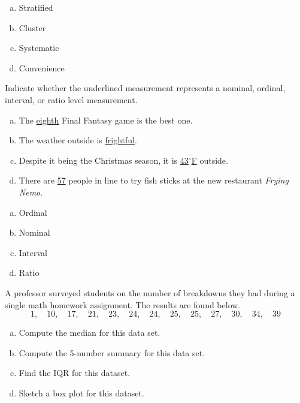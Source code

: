 \documentclass[12pt,letterpaper]{exam}
\begin{document}
\begin{questions}
\sol 
\begin{enumerate}[(a)]
\item Stratified \pspace

\item Cluster \pspace

\item Systematic \pspace

\item Convenience 
\end{enumerate}



\newpage
\question[10] Indicate whether the underlined measurement represents a nominal, ordinal, interval, or ratio level measurement.
	\begin{enumerate}[(a)]
	\item The \underline{eighth} Final Fantasy game is the best one. 
	\item The weather outside is \underline{frightful}. 	
	\item Despite it being the Christmas season, it is \underline{43$^\circ$F} outside. 
	\item There are \underline{57} people in line to try fish sticks at the new restaurant \textit{Frying Nemo}. 
	\end{enumerate} \pspace

\sol 
\begin{enumerate}[(a)]
\item Ordinal \pspace

\item Nominal \pspace

\item Interval \pspace

\item Ratio
\end{enumerate}



\newpage
\question[10] A professor surveyed students on the number of breakdowns they had during a single math homework assignment. The results are found below. 
	\[
	1, \quad 10, \quad 17, \quad 21, \quad 23, \quad 24, \quad 24, \quad 25, \quad 25, \quad 27, \quad 30, \quad 34, \quad 39
	\]

\begin{enumerate}[(a)]
\item Compute the median for this data set. 
\item Compute the 5-number summary for this data set. 
\item Find the IQR for this dataset. 
\item Sketch a box plot for this dataset. 
\end{enumerate} \pspace


\end{questions}
\end{document}
